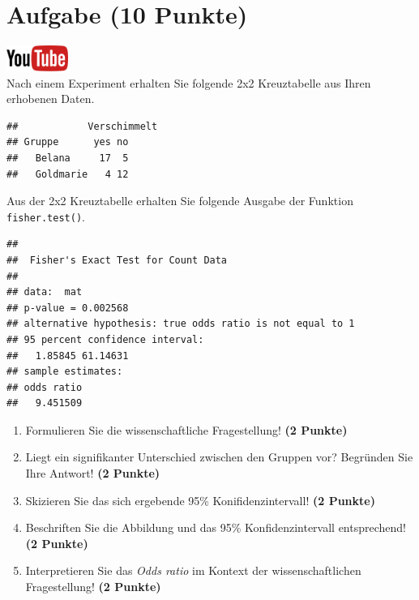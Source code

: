 \documentclass[a4paper, 10pt]{scrartcl}\usepackage[]{graphicx}\usepackage[]{xcolor}
\makeatletter
\newenvironment{kframe}{%
 \def\at@end@of@kframe{}%
 \ifinner\ifhmode%
  \def\at@end@of@kframe{\end{minipage}}%
  \begin{minipage}{\columnwidth}%
 \fi\fi%
 \def\FrameCommand##1{\hskip\@totalleftmargin \hskip-\fboxsep
 \colorbox{shadecolor}{##1}\hskip-\fboxsep
     \hskip-\linewidth \hskip-\@totalleftmargin \hskip\columnwidth}%
 \MakeFramed {\advance\hsize-\width
   \@totalleftmargin\z@ \linewidth\hsize
   \@setminipage}}%
 {\par\unskip\endMakeFramed%
 \at@end@of@kframe}
\newenvironment{knitrout}{}{} %
\makeatother
\begin{document}
\section{Aufgabe \hfill (10 Punkte)}

\hfill\href{https://youtu.be/ghArbetOr_E}{\includegraphics[width =
  2cm]{img/youtube}}\\[1Ex]

Nach einem Experiment erhalten Sie folgende 2x2 Kreuztabelle aus Ihren
erhobenen Daten.

\begin{knitrout}
\color{fgcolor}\begin{kframe}
\begin{verbatim}
##            Verschimmelt
## Gruppe      yes no
##   Belana     17  5
##   Goldmarie   4 12
\end{verbatim}
\end{kframe}
\end{knitrout}

Aus der 2x2 Kreuztabelle erhalten Sie folgende \Rlogo Ausgabe der Funktion
\texttt{fisher.test()}.

\begin{knitrout}
\color{fgcolor}\begin{kframe}
\begin{verbatim}
## 
## 	Fisher's Exact Test for Count Data
## 
## data:  mat
## p-value = 0.002568
## alternative hypothesis: true odds ratio is not equal to 1
## 95 percent confidence interval:
##   1.85845 61.14631
## sample estimates:
## odds ratio 
##   9.451509
\end{verbatim}
\end{kframe}
\end{knitrout}


\begin{enumerate}
\item Formulieren Sie die wissenschaftliche Fragestellung! \textbf{(2 Punkte)}
\item Liegt ein signifikanter Unterschied zwischen den Gruppen vor?
  Begr{\"u}nden Sie Ihre Antwort! \textbf{(2 Punkte)}
\item Skizieren Sie das sich ergebende 95\% Konifidenzintervall! \textbf{(2 Punkte)}
\item Beschriften Sie die Abbildung und
  das 95\% Konfidenzintervall entsprechend! \textbf{(2 Punkte)} 
\item Interpretieren Sie das \textit{Odds ratio} im Kontext der
  wissenschaftlichen Fragestellung! \textbf{(2 Punkte)} 
\end{enumerate}
 
\end{document}
